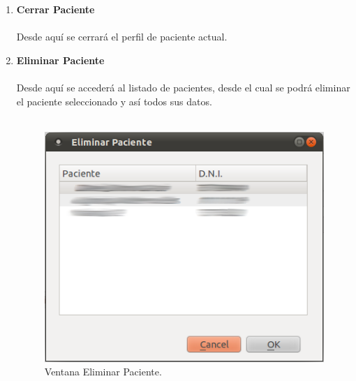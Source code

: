 \begin{enumerate}
\item \textbf{Cerrar Paciente}\\\\
Desde aquí se cerrará el perfil de paciente actual.
\item \textbf{Eliminar Paciente}\\\\
Desde aquí se accederá al listado de pacientes, desde el cual se podrá eliminar el paciente seleccionado y así todos sus datos.\\\\
\begin{figure}[H]
  \label{eliminar_paciente}
  \begin{center}
    \includegraphics[scale=0.5]{../../Image/paciente-eliminar.png}
  \end{center}
  \caption{Ventana Eliminar Paciente.}
\end{figure}

\end{enumerate}


